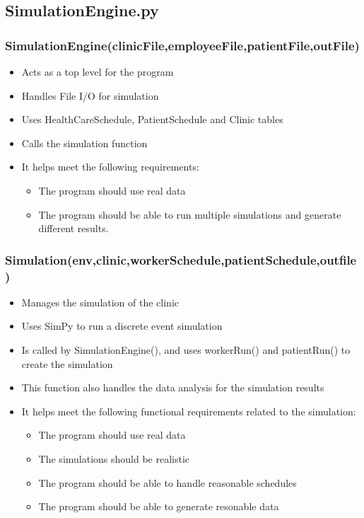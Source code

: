\documentclass[12pt]{article}
\begin{document}
\subsection{SimulationEngine.py}
\subsubsection{SimulationEngine(clinicFile,employeeFile,patientFile,outFile)}
\begin{itemize}  
\item Acts as a top level for the program
\item Handles File I/O for simulation
\item Uses HealthCareSchedule, PatientSchedule and Clinic tables
\item Calls the simulation function
\item It helps meet the following requirements:
	\begin{itemize}
	\item The program should use real data
	\item The program should be able to run multiple simulations and generate different results.
	\end{itemize}
\end{itemize}
\subsubsection{Simulation(env,clinic,workerSchedule,patientSchedule,outfile)}
\begin{itemize}
	\item Manages the simulation of the clinic
	\item Uses SimPy to run a discrete event simulation
	\item Is called by SimulationEngine(), and uses workerRun() and patientRun() to create the simulation
	\item This function also handles the data analysis for the simulation results
	\item It helps meet the following functional requirements related to the simulation:
	\begin{itemize}
		\item The program should use real data
		\item The simulations should be realistic
		\item The program should be able to handle reasonable schedules
		\item The program should be able to generate resonable data
	\end{itemize}
\end{itemize}
\end{document}

